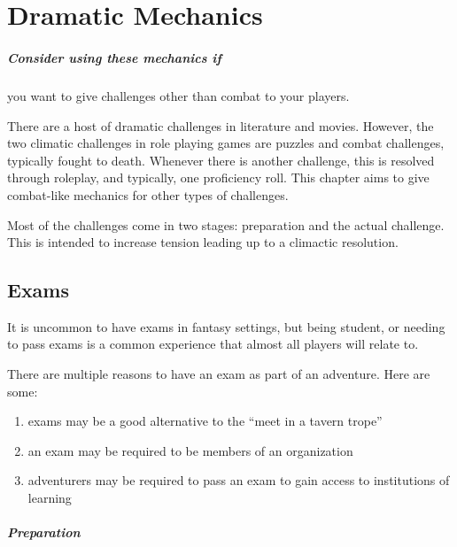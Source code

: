 \documentclass[twocolumn]{dndbook}
\begin{document}
\chapter{Dramatic Mechanics}

\begin{emphasisParagraph}
	\paragraph*{Consider using these mechanics if} you want to give challenges other than combat to your players.
\end{emphasisParagraph}

There are a host of dramatic challenges in literature and movies.
However, the two climatic challenges in role playing games are puzzles and combat challenges, typically fought to death.
Whenever there is another challenge, this is resolved through roleplay, and typically, one proficiency roll.
This chapter aims to give combat-like mechanics for other types of challenges.\par

Most of the challenges come in two stages: preparation and the actual challenge.
This is intended to increase tension leading up to a climactic resolution.\par

\section{Exams}

It is uncommon to have exams in fantasy settings, but being student, or needing to pass exams is a common experience that almost all players will relate to.\par

There are multiple reasons to have an exam as part of an adventure. Here are some:
\begin{enumerate}
    \item exams may be a good alternative to the ``meet in a tavern trope''
    \item an exam may be required to be members of an organization
    \item adventurers may be required to pass an exam to gain access to institutions of learning
\end{enumerate}


\paragraph*{Preparation}
\end{document}
